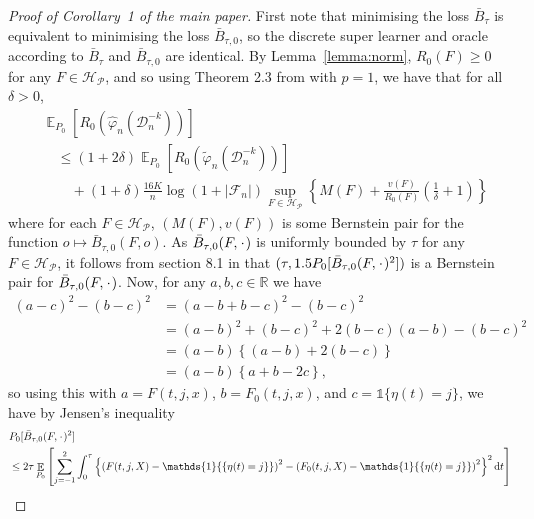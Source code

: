 \documentclass[11pt]{article}
\theoremstyle{thmstyleone}%
\theoremstyle{thmstyletwo}%
\theoremstyle{thmstylethree}%
\DeclareMathOperator{\E}{\mathbb{E}} %
\newcommand{\R}{\mathbb{R}}
\newcommand{\blank}{\makebox[1ex]{\textbf{$\cdot$}}}
\renewcommand{\phi}{\varphi}
\newcommand*\diff{\mathop{}\!\mathrm{d}}
\newcommand{\1}{\mathds{1}}
\newcommand{\data}{\ensuremath{\mathcal{D}}}
\begin{document}
\begin{proof}[Proof of Corollary~1 of the main paper]
  First note that minimising the loss \( \bar{B}_{\tau} \) is equivalent to
  minimising the loss \( \bar{B}_{\tau,0} \), so the discrete super learner and
  oracle according to \( \bar{B}_{\tau} \) and \( \bar{B}_{\tau,0} \) are
  identical. By Lemma~\ref{lemma:norm}, \( R_0(F) \geq 0 \) for any
  \( F \in \mathcal{H}_{\mathcal{P}} \), and so using Theorem 2.3 from \citep{vaart2006oracle} with
  \( p=1 \), we have that for all \( \delta >0 \),
\begin{align*}
  & \E_{P_0}{\left[ R_0(\hat{\phi}_n(\data_n^{-k})) \right]}
  \\
  &  \quad \leq
    (1+2\delta)\E_{P_0}{\left[ R_0(\tilde{\phi}_n(\data_n^{-k})) \right]}
  \\
  & \qquad + (1+\delta) \frac{16 K}{n}
    \log(1 + |\mathcal{F}_n|)\sup_{F \in \mathcal{H}_{\mathcal{P}}}
    \left\{
    M(F) + \frac{v(F)}{R_0(F)}
    \left(
    \frac{1}{\delta} + 1
    \right)
    \right\}
\end{align*}
where for each \( F \in \mathcal{H}_{\mathcal{P}} \), \( (M(F), v(F)) \) is some Bernstein pair for
the function \(o \mapsto \bar{B}_{\tau,0}(F, o) \). As
\( \bar{B}_{\tau,0}(F, \blank) \) is uniformly bounded by \( \tau \) for any
\( F \in \mathcal{H}_{\mathcal{P}} \), it follows from section 8.1 in \citep{vaart2006oracle} that
\( (\tau, 1.5 P_0{[\bar{B}_{\tau,0}(F, \blank)^2]}) \) is a Bernstein pair for
\( \bar{B}_{\tau,0}(F, \blank) \). Now, for any \( a,b,c \in \R \) we have
\begin{align*}
  (a-c)^2 - (b-c)^2
  & = (a-b+b-c)^2 - (b-c)^2
  \\
  & = (a-b)^2 + (b-c)^2 +2(b-c)(a-b) - (b-c)^2
  \\
  & = (a-b)
    \left\{
    (a-b) +  2(b-c)
    \right\}
  \\
  & = (a-b)
    \left\{
     a + b -2c
    \right\},
\end{align*}
so using this with \( a=F(t, j, x) \), \( b=F_0(t, j, x) \), and
\( c = \1{\{\eta(t) = j\}} \), we have by Jensen's inequality
\begin{align*}
  & P_0{[\bar{B}_{\tau,0}(F, \blank)^2]}
  \\
  & \leq
    2\tau\E_{P_0}{\left[
    \sum_{j=-1}^{2} \int_0^{\tau}
    \left\{
    \left(
    F(t, j, X) - \1{\{\eta(t) = j\}}
    \right)^2
    -
    \left(
    F_0(t, j, X) - \1{\{\eta(t) = j\}}
    \right)^2
    \right\}^2
    \diff t 
    \right]}
  \\

\end{align*}
\end{proof}
\end{document}
